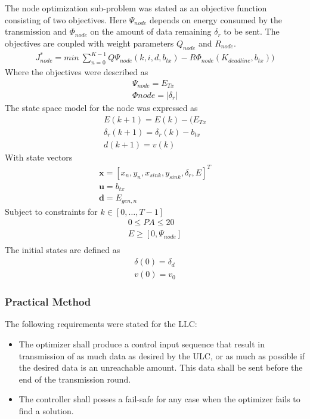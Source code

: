 \noindent The node optimization sub-problem was stated as an objective function consisting of two objectives. Here $\Psi_{node}$ depends on energy consumed by the transmission and $\Phi_{node}$ on the amount of data remaining $\delta_r$ to be sent. The objectives are coupled with weight parameters $Q_{node}$ and $R_{node}$.
\begin{align}
    J_{node}^* = min \: \sum_{n=0}^{K-1} Q\Psi_{node}(k,i,d,b_{tx}) - R\Phi_{node}(K_{deadline},b_{tx}))
\end{align}
Where the objectives were described as
\begin{align}
    \Psi_{node} = E_{Tx}\\
    \Phi{node} = |\delta_r|
\end{align}
The state space model for the node was expressed as
\begin{align}
    E(k+1) = E(k) - (E_{Tx} \\
    \delta_{r}(k+1) = \delta_r(k) - b_{tx}\\
    d(k+1) = v(k)
\end{align}
With state vectors
\begin{align}
    \textbf{x} = [x_{n}, y_{n}, x_{sink}, y_{sink}, \delta_{r}, E]^{T} \\
    \textbf{u} = b_{tx}\\
    \textbf{d} = E_{gen,n}
\end{align}
Subject to constraints for $k\in [0,\hdots,T-1]$
\begin{align}
    0 \leq PA \leq 20 \\
    E \geq [0,\Psi_{node}] \\
\end{align}
The initial states are defined as
\begin{align}
    \delta(0) = \delta_{d}  \\ %
    v(0) = v_0
\end{align}

\subsubsection*{Practical Method}
\noindent The following requirements were stated for the LLC:
\begin{itemize}
    \item The optimizer shall produce a control input sequence that result in transmission of as much data as desired by the ULC, or as much as possible if the desired data is an unreachable amount. This data shall be sent before the end of the transmission round.
    \item The controller shall posses a fail-safe for any case when the optimizer fails to find a solution.
\end{itemize}

